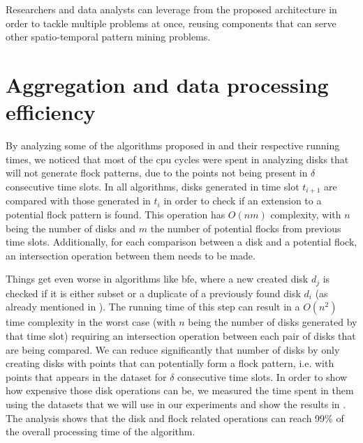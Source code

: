 Researchers and data analysts can leverage from the proposed architecture in order to tackle multiple problems at once,
reusing components that can serve other spatio-temporal pattern mining problems.

\section{Aggregation and data processing efficiency}
\label{sec:aggreg_efficiency}
By analyzing some of the algorithms proposed in  and their respective running times, we noticed
that most of the \ac{cpu} cycles were spent in analyzing disks that will not generate flock patterns, due to the points
not being present in $\delta$ consecutive time slots. In all algorithms, disks generated in time slot $t_{i+1}$ are
compared with those generated in $t_{i}$ in order to check if an extension to a potential flock pattern is found. This
operation has $O(nm)$ complexity, with $n$ being the number of disks and $m$ the number of potential flocks from
previous time slots.  Additionally, for each comparison between a disk and a potential flock, an intersection operation
between them needs to be made.

Things get even worse in algorithms like \ac{bfe}, where a new created disk $d_j$ is checked if it is either subset or a
duplicate of a previously found disk $d_i$ (as already mentioned in ). The running time of
this step can result in a $O(n^2)$ time complexity in the worst case (with $n$ being the number of disks generated by
that time slot) requiring an intersection operation between each pair of disks that are being compared. We can reduce
significantly that number of disks by only creating disks with points that can potentially form a flock pattern, i.e.
with points that appears in the dataset for $\delta$ consecutive time slots. In order to show how expensive those disk
operations can be, we measured the time spent in them using the datasets that we will use in our experiments and show
the results in . The analysis shows that the disk and flock related operations can reach
99\% of the overall processing time of the algorithm.

